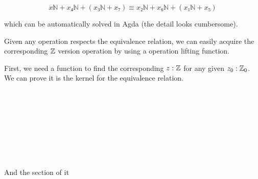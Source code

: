 \documentclass{article}
\begin{document}
$$x ℕ+ x₄ ℕ+ (x₃ ℕ+ x₇) ≡ x₂ ℕ+ x₆ ℕ+ (x₁ ℕ+ x₅)$$

which can be automatically solved in Agda (the detail looks cumbersome).

Given any operation respects the equivalence relation, we can easily
acquire the corresponding $\mathbb{Z}$ version operation by using a operation lifting function.

First, we need a function to find the corresponding $z : \mathbb{Z}$ for any given $z_0 : \mathbb{Z}_0$.
We can prove it is the kernel for the equivalence relation.


\begin{code}\>\<%
\\
%
\\
\>\AgdaFunction{[\_]} \<[20]%
\>[20]\AgdaSymbol{:}   \<%
\\
\>\AgdaFunction{[}  \AgdaInductiveConstructor{,}  \AgdaFunction{]} \<[20]%
\>[20]\AgdaSymbol{=} \AgdaInductiveConstructor{+} \<%
\\
\>\AgdaFunction{[}  \AgdaInductiveConstructor{,}   \AgdaFunction{]} \<[20]%
\>[20]\AgdaSymbol{=} \AgdaInductiveConstructor{-[1+}  \AgdaInductiveConstructor{]}\<%
\\
\>\AgdaFunction{[}   \AgdaInductiveConstructor{,}   \AgdaFunction{]} \<[20]%
\>[20]\AgdaSymbol{=} \AgdaFunction{[}  \AgdaInductiveConstructor{,}  \AgdaFunction{]}\<%
\\
%
\\
\>\<\end{code}

And the section of it

\begin{code}\>\<%
\\
%
\\
\> \<[14]%
\>[14]\AgdaSymbol{:}   \<%
\\
\> \AgdaInductiveConstructor{+}   \<[14]%
\>[14]\AgdaSymbol{=}  \AgdaInductiveConstructor{,} \<%
\\
\> \AgdaInductiveConstructor{-[1+}  \AgdaInductiveConstructor{]}  \<[14]%
\>[14]\AgdaSymbol{=}  \AgdaInductiveConstructor{,}  \<%
\\
%
\\
\>\<\end{code}
\end{document}
